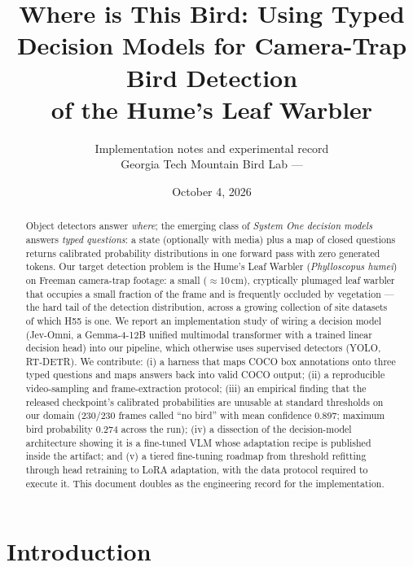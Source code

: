 \documentclass[11pt]{article}
\title{Where is This Bird: Using Typed Decision Models for Camera-Trap Bird Detection\\
of the Hume's Leaf Warbler}
\author{%
  Implementation notes and experimental record\\
  Georgia Tech Mountain Bird Lab --- \code{freeman-bird-detection}
}
\date{October 4, 2026}
\newcommand{\sone}{System One}
\begin{document}
\maketitle

\begin{abstract}
Object detectors answer \emph{where}; the emerging class of \emph{\sone{}
decision models} answers \emph{typed questions}: a state (optionally with
media) plus a map of closed questions returns calibrated probability
distributions in one forward pass with zero generated tokens. Our target
detection problem is the Hume's Leaf Warbler (\emph{Phylloscopus humei}) on
Freeman camera-trap footage: a small ($\approx$10\,cm), cryptically plumaged
leaf warbler that occupies a small fraction of the frame and is frequently
occluded by vegetation --- the hard tail of the detection distribution, across
a growing collection of site datasets of which H55 is one. We report an
implementation study of wiring a decision model (Jev-Omni, a Gemma-4-12B
unified multimodal transformer with a trained linear decision head) into our
pipeline, which otherwise uses supervised detectors (YOLO, RT-DETR). We
contribute: (i) a harness that maps COCO box annotations onto three typed
questions and maps answers back into valid COCO output; (ii) a reproducible
video-sampling and frame-extraction protocol; (iii) an empirical finding that
the released checkpoint's calibrated probabilities are unusable at standard
thresholds on our domain (230/230 frames called ``no bird'' with mean
confidence 0.897; maximum bird probability 0.274 across the run); (iv) a
dissection of the decision-model architecture showing it is a fine-tuned VLM
whose adaptation recipe is published inside the artifact; and (v) a tiered
fine-tuning roadmap from threshold refitting through head retraining to LoRA
adaptation, with the data protocol required to execute it. This document
doubles as the engineering record for the implementation.
\end{abstract}

\section{Introduction}
\end{document}

